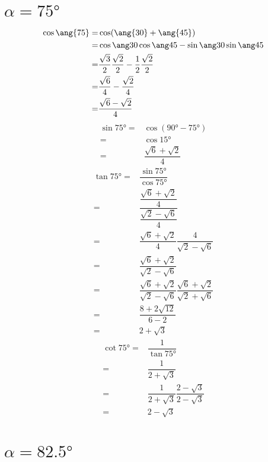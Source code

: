 \section{$\alpha=\ang{75}$}
\begin{align*}
	\cos\ang{75}=&\cos(\ang{30}+\ang{45})\\
	=&\sumcos{30}{45}\\
	=&\costrenta\cosquarantacinque-\sintrenta\sinquarantecinque\\
	=&\dfrac{\sqrt{6}}{4}-\dfrac{\sqrt{2}}{4}\\
	=&\dfrac{\sqrt{6}-\sqrt{2}}{4}
\end{align*}
\begin{align*}
	\sin\ang{75}=&\cos(\ang{90}-\ang{75})\\
	=&\cos\ang{15}\\
	=&\dfrac{\sqrt{6}+\sqrt{2}}{4}
\end{align*}
\begin{align*}
	\tan\ang{75}=&\dfrac{\sin\ang{75}}{\cos\ang{75}}\\
	=&\dfrac{\dfrac{\sqrt{6}+\sqrt{2}}{4}}{\dfrac{\sqrt{2}-\sqrt{6}}{4}}\\
	=&\dfrac{\sqrt{6}+\sqrt{2}}{4}\dfrac{4}{\sqrt{2}-\sqrt{6}}\\
	=&\dfrac{\sqrt{6}+\sqrt{2}}{\sqrt{2}-\sqrt{6}}\\
	=&\dfrac{\sqrt{6}+\sqrt{2}}{\sqrt{2}-\sqrt{6}}\dfrac{\sqrt{6}+\sqrt{2}}{\sqrt{2}+\sqrt{6}}\\
	=&\dfrac{8+2\sqrt{12}}{6-2}\\
	=&2+\sqrt{3}
\end{align*}
\begin{align*}
	\cot\ang{75}=&\dfrac{1}{\tan\ang{75}}\\
	=&\dfrac{1}{2+\sqrt{3}}\\
	=&\dfrac{1}{2+\sqrt{3}}\dfrac{2-\sqrt{3}}{2-\sqrt{3}}\\
	=&2-\sqrt{3}\\
\end{align*}

\section{$\alpha=\ang{82.5}$}

